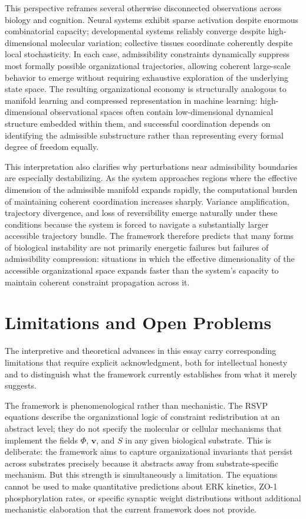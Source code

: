 \documentclass[11pt,a4paper]{article}
\theoremstyle{plain}
\theoremstyle{definition}
\begin{document}
This perspective reframes several otherwise disconnected observations across biology
and cognition. Neural systems exhibit sparse activation despite enormous combinatorial
capacity; developmental systems reliably converge despite high-dimensional molecular
variation; collective tissues coordinate coherently despite local stochasticity. In each
case, admissibility constraints dynamically suppress most formally possible organizational
trajectories, allowing coherent large-scale behavior to emerge without requiring
exhaustive exploration of the underlying state space. The resulting organizational
economy is structurally analogous to manifold learning and compressed representation
in machine learning: high-dimensional observational spaces often contain low-dimensional
dynamical structure embedded within them, and successful coordination depends on
identifying the admissible substructure rather than representing every formal degree
of freedom equally.

This interpretation also clarifies why perturbations near admissibility boundaries are
especially destabilizing. As the system approaches regions where the effective dimension
of the admissible manifold expands rapidly, the computational burden of maintaining
coherent coordination increases sharply. Variance amplification, trajectory divergence,
and loss of reversibility emerge naturally under these conditions because the system is
forced to navigate a substantially larger accessible trajectory bundle. The framework
therefore predicts that many forms of biological instability are not primarily energetic
failures but failures of admissibility compression: situations in which the effective
dimensionality of the accessible organizational space expands faster than the system's
capacity to maintain coherent constraint propagation across it.

\section{Limitations and Open Problems}
\label{sec:limitations}

The interpretive and theoretical advances in this essay carry corresponding limitations
that require explicit acknowledgment, both for intellectual honesty and to distinguish
what the framework currently establishes from what it merely suggests.

The framework is phenomenological rather than mechanistic. The RSVP equations describe
the organizational logic of constraint redistribution at an abstract level; they do not
specify the molecular or cellular mechanisms that implement the fields $\Phi$, $\mathbf{v}$,
and $S$ in any given biological substrate. This is deliberate: the framework aims to
capture organizational invariants that persist across substrates precisely because it
abstracts away from substrate-specific mechanism. But this strength is simultaneously
a limitation. The equations cannot be used to make quantitative predictions about ERK
kinetics, ZO-1 phosphorylation rates, or specific synaptic weight distributions without
additional mechanistic elaboration that the current framework does not provide.
\end{document}
